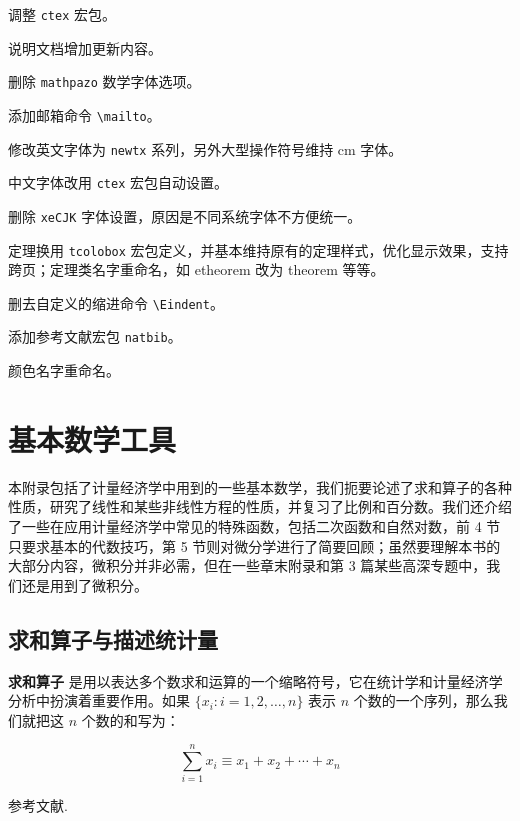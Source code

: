 \documentclass[lang=cn,10pt,cite=super]{elegantbook}
\begin{document}

\begin{change}
  \item 调整 \lstinline{ctex} 宏包。
  \item 说明文档增加更新内容。
\end{change}


\begin{change}
  \item 删除 \lstinline{mathpazo} 数学字体选项。
  \item 添加邮箱命令 \lstinline{\mailto}。
  \item 修改英文字体为 \lstinline{newtx} 系列，另外大型操作符号维持 cm 字体。
  \item 中文字体改用 \lstinline{ctex} 宏包自动设置。
  \item 删除 \lstinline{xeCJK} 字体设置，原因是不同系统字体不方便统一。
  \item 定理换用 \lstinline{tcolobox} 宏包定义，并基本维持原有的定理样式，优化显示效果，支持跨页；定理类名字重命名，如 etheorem 改为 theorem 等等。
  \item 删去自定义的缩进命令 \lstinline{\Eindent}。
  \item 添加参考文献宏包 \lstinline{natbib}。
  \item 颜色名字重命名。
\end{change}


\chapter{基本数学工具}


本附录包括了计量经济学中用到的一些基本数学，我们扼要论述了求和算子的各种性质，研究了线性和某些非线性方程的性质，并复习了比例和百分数。我们还介绍了一些在应用计量经济学中常见的特殊函数，包括二次函数和自然对数，前 4 节只要求基本的代数技巧，第 5 节则对微分学进行了简要回顾；虽然要理解本书的大部分内容，微积分并非必需，但在一些章末附录和第 3 篇某些高深专题中，我们还是用到了微积分。

\section{求和算子与描述统计量}

\textbf{求和算子} 是用以表达多个数求和运算的一个缩略符号，它在统计学和计量经济学分析中扮演着重要作用。如果 $\{x_i: i=1, 2, \ldots, n\}$ 表示 $n$ 个数的一个序列，那么我们就把这 $n$ 个数的和写为：

\begin{equation}
\sum_{i=1}^n x_i \equiv x_1 + x_2 +\cdots + x_n
\end{equation}

参考文献\cite{cn1,cn2, en1, en2}. 

\nocite{*}
\printbibliography[heading=bibintoc, title=\ebibname]
\end{document}
